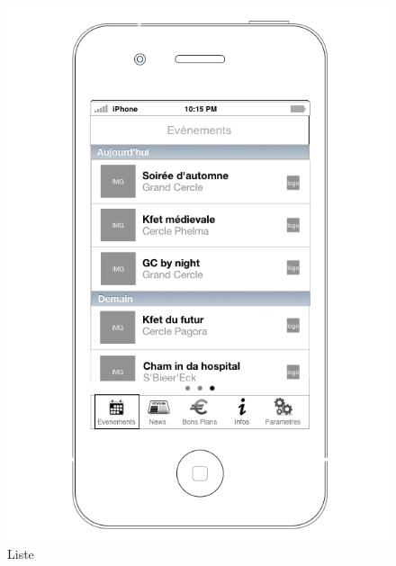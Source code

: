 \documentclass[a4paper, 11pt]{article}
\begin{document}
\begin{figure}[htbp]
\begin{minipage}[c]{.33\linewidth}
	\end{minipage}
	\hfill
	\begin{minipage}[c]{.33\linewidth}
		\begin{center}
			\includegraphics[scale=0.28]{../../Sketch/iOS/evenements_liste.png}
		\end{center}
	\caption{Liste}
	\label{even_liste}


\end{minipage}
\end{figure}
\end{document}
